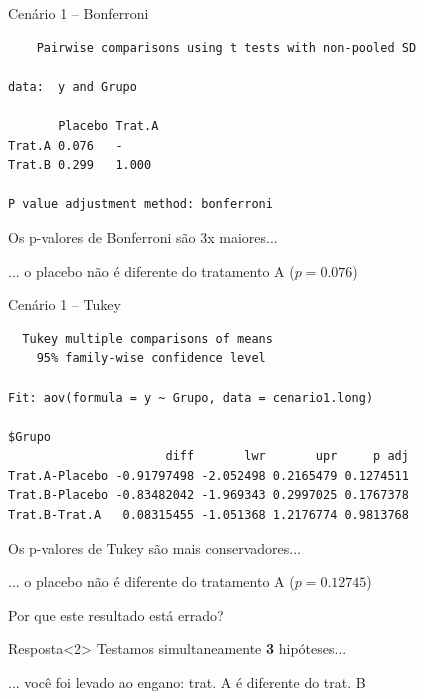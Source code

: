 \documentclass{beamer}
\begin{document}

\begin{frame}[fragile]
  \begin{exampleblock}{Cenário 1 -- Bonferroni}
    \scriptsize
\begin{verbatim}
	Pairwise comparisons using t tests with non-pooled SD 

data:  y and Grupo 

       Placebo Trat.A
Trat.A 0.076   -     
Trat.B 0.299   1.000 

P value adjustment method: bonferroni
\end{verbatim}
  \end{exampleblock}
  \begin{block}{}
    \small
    Os p-valores de Bonferroni são 3x maiores...

    \bigskip
    ... o placebo não é diferente do tratamento A ($p=0.076$)
  \end{block}
\end{frame}

\begin{frame}[fragile]
  \begin{exampleblock}{Cenário 1 -- Tukey}
    \scriptsize
\begin{verbatim}
  Tukey multiple comparisons of means
    95% family-wise confidence level

Fit: aov(formula = y ~ Grupo, data = cenario1.long)

$Grupo
                      diff       lwr       upr     p adj
Trat.A-Placebo -0.91797498 -2.052498 0.2165479 0.1274511
Trat.B-Placebo -0.83482042 -1.969343 0.2997025 0.1767378
Trat.B-Trat.A   0.08315455 -1.051368 1.2176774 0.9813768
\end{verbatim}
  \end{exampleblock}
  \begin{block}{}
    \small
    Os p-valores de Tukey são mais conservadores...

    \bigskip
    ... o placebo não é diferente do tratamento A ($p=0.12745$)
  \end{block}
\end{frame}


\begin{frame}
  \begin{center}
    Por que este resultado está errado?
  \end{center}

  \vfill
  \begin{block}{Resposta}<2>
    Testamos simultaneamente {\bf 3} hipóteses...

    \bigskip
    \small
    ... você foi levado ao engano: trat. A é diferente do trat. B
  \end{block}
\end{frame}
\end{document}
